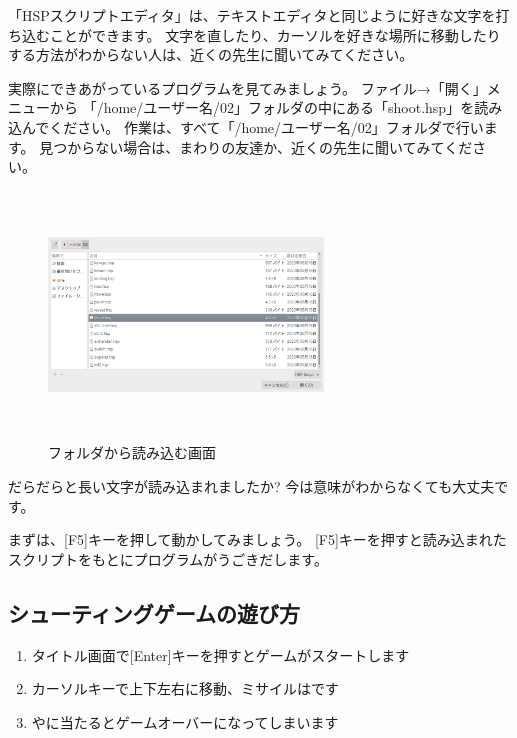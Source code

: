 「HSPスクリプトエディタ」は、テキストエディタと同じように好きな文字を打ち込むことができます。
文字を直したり、カーソルを好きな場所に移動したりする方法がわからない人は、近くの先生に聞いてみてください。

実際にできあがっているプログラムを見てみましょう。
ファイル→「開く」メニューから 「/home/ユーザー名/02」フォルダの中にある「shoot.hsp」を読み込んでください。
作業は、すべて「/home/ユーザー名/02」フォルダで行います。
見つからない場合は、まわりの友達か、近くの先生に聞いてみてください。

\begin{figure}[H]
  \begin{center}
    \includegraphics[keepaspectratio,width=7.31cm,height=6.562cm]{images/chap02/s_openfolder.png}
    \caption{フォルダから読み込む画面}
  \end{center}
  \label{fig:hsed_openfolder}
\end{figure}

だらだらと長い文字が読み込まれましたか?
今は意味がわからなくても大丈夫です。

まずは、[F5]キーを押して動かしてみましょう。
[F5]キーを押すと読み込まれたスクリプトをもとにプログラムがうごきだします。
\clearpage

% 
% 
% 
\subsection{シューティングゲームの遊び方}

\begin{enumerate}
  \item タイトル画面で[Enter]キーを押すとゲームがスタートします
  \item カーソルキーで上下左右に移動、ミサイルはです
  \item {}やに当たるとゲームオーバーになってしまいます
\end{enumerate}

